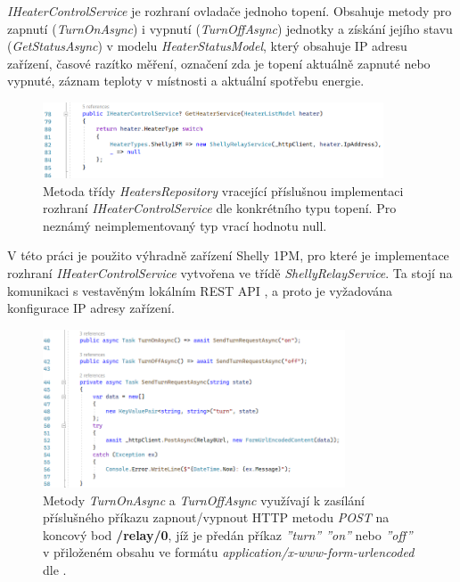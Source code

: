 {\it IHeaterControlService} je rozhraní ovladače jednoho topení. Obsahuje metody pro zapnutí ({\it TurnOnAsync}) i vypnutí ({\it TurnOffAsync}) jednotky a získání jejího stavu ({\it GetStatusAsync}) v modelu {\it HeaterStatusModel}, který obsahuje IP adresu zařízení, časové razítko měření, označení zda je topení aktuálně zapnuté nebo vypnuté, záznam teploty v místnosti a aktuální spotřebu energie.

\begin{figure}[hbt]
\includegraphics[width=0.9\textwidth]{obrazky-figures/code-heaterservice-decode.png}
\caption{Metoda třídy {\it HeatersRepository} vracející příslušnou implementaci rozhraní {\it IHeaterControlService} dle konkrétního typu topení. Pro neznámý neimplementovaný typ vrací hodnotu null.}
\end{figure}

V této práci je použito výhradně zařízení Shelly 1PM, pro které je implementace rozhraní {\it IHeaterControlService} vytvořena ve třídě {\it ShellyRelayService}. Ta stojí na komunikaci s vestavěným lokálním REST API \cite{shelly_api}, a proto je vyžadována konfigurace IP adresy zařízení.

\pagebreak

\begin{figure}[hbt]
\includegraphics[width=0.8\textwidth]{obrazky-figures/code-shellyturns.png}
\caption{Metody {\it TurnOnAsync} a {\it TurnOffAsync} využívají k zasílání příslušného příkazu zapnout/vypnout HTTP metodu {\it POST} na koncový bod \textbf{/relay/0}, jíž je předán příkaz {\it ''turn'' ''on''} nebo {\it ''off''} v přiloženém obsahu ve formátu {\it application/x-www-form-urlencoded} dle \cite{shelly_http}.}
\end{figure}

